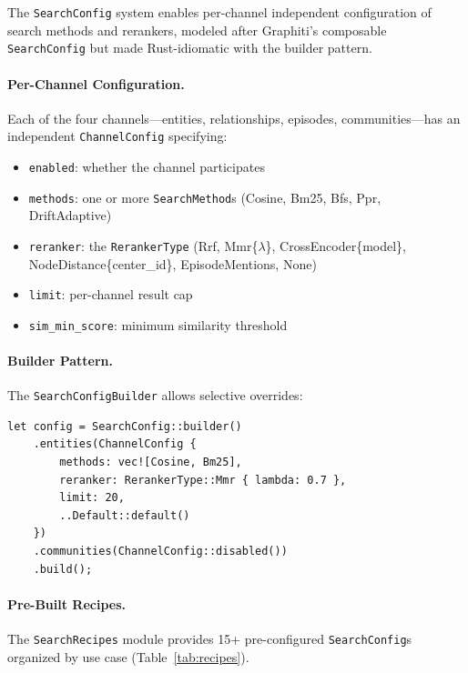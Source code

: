 \documentclass[11pt,a4paper,twocolumn]{article}
\begin{document}
The \texttt{SearchConfig} system enables per-channel independent
configuration of search methods and rerankers, modeled after
Graphiti's composable \texttt{SearchConfig} but made Rust-idiomatic
with the builder pattern.

\paragraph{Per-Channel Configuration.}
Each of the four channels---entities, relationships, episodes,
communities---has an independent \texttt{ChannelConfig} specifying:
\begin{itemize}[leftmargin=*]
  \item \texttt{enabled}: whether the channel participates
  \item \texttt{methods}: one or more \texttt{SearchMethod}s
    (Cosine, Bm25, Bfs, Ppr, DriftAdaptive)
  \item \texttt{reranker}: the \texttt{RerankerType}
    (Rrf, Mmr\{$\lambda$\}, CrossEncoder\{model\},
    NodeDistance\{center\_id\}, EpisodeMentions, None)
  \item \texttt{limit}: per-channel result cap
  \item \texttt{sim\_min\_score}: minimum similarity threshold
\end{itemize}

\paragraph{Builder Pattern.}
The \texttt{SearchConfigBuilder} allows selective overrides:
\begin{lstlisting}
let config = SearchConfig::builder()
    .entities(ChannelConfig {
        methods: vec![Cosine, Bm25],
        reranker: RerankerType::Mmr { lambda: 0.7 },
        limit: 20,
        ..Default::default()
    })
    .communities(ChannelConfig::disabled())
    .build();
\end{lstlisting}

\paragraph{Pre-Built Recipes.}
The \texttt{SearchRecipes} module provides 15+ pre-configured
\texttt{SearchConfig}s organized by use case
(Table~\ref{tab:recipes}).
\end{document}
